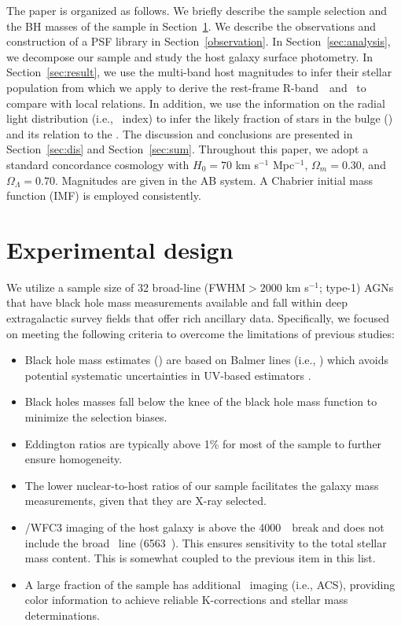 \documentclass[apj]{emulateapj}
\begin{document}
The paper is organized as follows. We briefly describe the sample selection and the BH masses of the sample in Section~\ref{sec:data}. We describe the observations and construction of a PSF library in Section~\ref{observation}. In Section~\ref{sec:analysis}, we decompose our sample and study the host galaxy surface photometry. In Section~\ref{sec:result}, we use the multi-band host magnitudes to infer their stellar population from which we apply to derive the rest-frame R-band \lhost\,~and \smass\ to compare with local relations. In addition, we use the information on the radial light distribution (i.e., \sersic\ index) to infer the likely fraction of stars in the bulge (\bmass) and its relation to the \mbh. The discussion and conclusions are presented in Section~\ref{sec:dis} and Section~\ref{sec:sum}. Throughout this paper, we adopt a standard concordance cosmology with $H_0= 70$ km s$^{-1}$ Mpc$^{-1}$, $\Omega{_m} = 0.30$, and $\Omega{_\Lambda} = 0.70$. Magnitudes are given in the AB system. A Chabrier initial mass function (IMF) is employed consistently.

\section{Experimental design}
\label{sec:data}
We utilize a sample size of 32 broad-line (FWHM$>2000$ km s$^{-1}$; type-1) AGNs that have black hole mass measurements available and fall within deep extragalactic survey fields that offer rich ancillary data. Specifically, we focused on meeting the following criteria to overcome the limitations of previous studies:

\begin{itemize}

\item Black hole mass estimates (\mbh) are based on Balmer lines (i.e., \halpha) which avoids potential systematic uncertainties in UV-based estimators \citep{Greene2005}.

\item Black holes masses fall below the knee of the black hole mass function to minimize the selection biases.

\item Eddington ratios are typically above 1\% for most of the sample to further ensure homogeneity.

\item The lower nuclear-to-host ratios of our sample facilitates the galaxy mass measurements, given that they are 
X-ray selected.

\item \hst/WFC3 imaging of the host galaxy is above the 4000~\angstrom\ break and does not include the broad \halpha\ line (6563~\angstrom). This ensures sensitivity to the total stellar mass content. This is somewhat coupled to the previous item in this list.

\item A large fraction of the sample has additional \hst\ imaging (i.e., ACS), providing color information to achieve reliable K-corrections and stellar mass determinations. 
\end{itemize}
\end{document}
